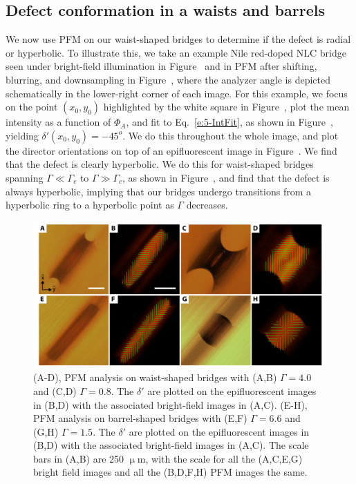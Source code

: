 \subsection{Defect conformation in a waists and barrels}
We now use PFM on our waist-shaped bridges to determine if the defect is radial or hyperbolic.
To illustrate this, we take an example Nile red-doped NLC bridge seen under bright-field illumination in Figure~ and in PFM after shifting, blurring, and downsampling in Figure~, where the analyzer angle is depicted schematically in the lower-right corner of each image.
For this example, we focus on the point $(x_0,y_0)$ highlighted by the white square in Figure~, plot the mean intensity as a function of $\Phi_A$, and fit to Eq.~\ref{e:5-IntFit}, as shown in Figure~, yielding $\delta'(x_0,y_0) = -45^o$.
We do this throughout the whole image, and plot the director orientations on top of an epifluorescent image in Figure~.
We find that the defect is clearly hyperbolic.
We do this for waist-shaped bridges spanning $\Gamma \ll \Gamma_c$ to $\Gamma \gg \Gamma_c$, as shown in Figure~, and find that the defect is always hyperbolic, implying that our bridges undergo transitions from a hyperbolic ring to a hyperbolic point as $\Gamma$ decreases.
\begin{figure}
  \centering
  \includegraphics{figures/C5/Ch5-Figs_PFM_Bridge.png}
  \caption{(A-D), PFM analysis on waist-shaped bridges with (A,B) $\Gamma = 4.0$ and (C,D) $\Gamma = 0.8$.
  The $\delta'$ are plotted on the epifluorescent images in (B,D) with the associated bright-field images in (A,C).
  (E-H), PFM analysis on barrel-shaped bridges with (E,F) $\Gamma = 6.6$ and (G,H) $\Gamma = 1.5$.
 The $\delta'$ are plotted on the epifluorescent images in (B,D) with the associated bright-field images in (A,C).
 The scale bars in (A,B) are 250 $\upmu$m, with the scale for all the (A,C,E,G) bright field images and all the (B,D,F,H) PFM images the same.}\label{f:5-PFM_Bridge}
\end{figure}


